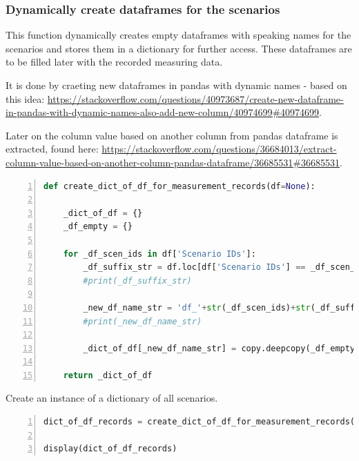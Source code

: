 \documentclass[10pt,parskip=half,
toc=sectionentrywithdots,
bibliography=totocnumbered,
captions=tableheading,numbers=noendperiod]{scrartcl}
\begin{document}
\hypertarget{dynamically-create-dataframes-for-the-scenarios}{%
\subsubsection{Dynamically create dataframes for the
scenarios}\label{dynamically-create-dataframes-for-the-scenarios}}

This function dynamically creates empty dataframes with speaking names
for the scenarios and stores them in a dictionary for further access.
These dataframes are to be filled later with the recorded measuring
data.

It is done by craeting new dataframes in pandas with dynamic names -
based on this idea:
\url{https://stackoverflow.com/questions/40973687/create-new-dataframe-in-pandas-with-dynamic-names-also-add-new-column/40974699\#40974699}.

Later on the column value based on another column from pandas dataframe
is extracted, found here:
\url{https://stackoverflow.com/questions/36684013/extract-column-value-based-on-another-column-pandas-dataframe/36685531\#36685531}.

\begin{codecell}[H]
\caption{Function for dynamically creation of empty dataframes}
\label{code:f_dym_dataframes}
\begin{lstlisting}[language=Python,numbers=left,xleftmargin=20pt,xrightmargin=5pt,belowskip=5pt,aboveskip=5pt]
def create_dict_of_df_for_measurement_records(df=None):

    _dict_of_df = {}
    _df_empty = {}

    for _df_scen_ids in df['Scenario IDs']:
        _df_suffix_str = df.loc[df['Scenario IDs'] == _df_scen_ids, 'Dataframe, CSV/Image suffixes'].iloc[0]
        #print(_df_suffix_str)

        _new_df_name_str = 'df_'+str(_df_scen_ids)+str(_df_suffix_str)
        #print(_new_df_name_str)

        _dict_of_df[_new_df_name_str] = copy.deepcopy(_df_empty)

    return _dict_of_df
\end{lstlisting}\end{codecell}

Create an instance of a dictionary of all scenarios.

\begin{codecell}[H]
\begin{lstlisting}[language=Python,numbers=left,xleftmargin=20pt,xrightmargin=5pt,belowskip=5pt,aboveskip=5pt]
dict_of_df_records = create_dict_of_df_for_measurement_records(df_measurement_configs)

display(dict_of_df_records)
\end{lstlisting}\end{codecell}
\end{document}
